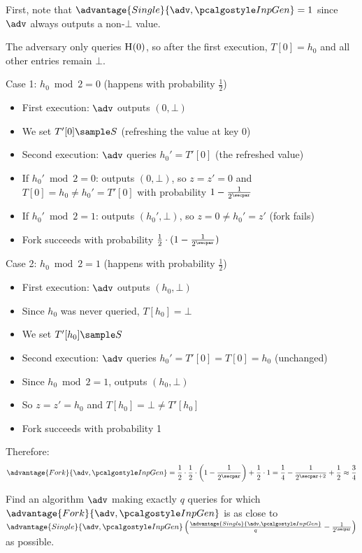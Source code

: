 \ifsolutions
\begin{mysolution}
  First, note that $\advantage{Single}{\adv, \algo{InpGen}} = 1$ since $\adv$ always outputs a non-$\bot$ value. 
  
  The adversary only queries ${\normalfont\textsc{H}}(0)$, so after the first execution, $T[0] = h_0$ and all other entries remain $\bot$.
  
  Case 1: $h_0 \bmod 2 = 0$ (happens with probability $\frac{1}{2}$)
  \begin{itemize}
    \item First execution: $\adv$ outputs $(0, \bot)$
    \item We set $T'[0] \sample S$ (refreshing the value at key 0)
    \item Second execution: $\adv$ queries $h_0' = T'[0]$ (the refreshed value)
    \item If $h_0' \bmod 2 = 0$: outputs $(0, \bot)$, so $z = z' = 0$ and $T[0] = h_0 \neq h_0' = T'[0]$ with probability $1 - \frac{1}{2^\secpar}$
    \item If $h_0' \bmod 2 = 1$: outputs $(h_0', \bot)$, so $z = 0 \neq h_0' = z'$ (fork fails)
    \item Fork succeeds with probability $\frac{1}{2} \cdot (1 - \frac{1}{2^\secpar})$
  \end{itemize}
  
  Case 2: $h_0 \bmod 2 = 1$ (happens with probability $\frac{1}{2}$)
  \begin{itemize}
    \item First execution: $\adv$ outputs $(h_0, \bot)$
    \item Since $h_0$ was never queried, $T[h_0] = \bot$
    \item We set $T'[h_0] \sample S$
    \item Second execution: $\adv$ queries $h_0' = T'[0] = T[0] = h_0$ (unchanged)
    \item Since $h_0 \bmod 2 = 1$, outputs $(h_0, \bot)$
    \item So $z = z' = h_0$ and $T[h_0] = \bot \neq T'[h_0]$
    \item Fork succeeds with probability 1
  \end{itemize}
  
  Therefore:
  \[
  \advantage{Fork}{\adv, \algo{InpGen}} = \frac{1}{2} \cdot \frac{1}{2} \cdot \left(1 - \frac{1}{2^\secpar}\right) + \frac{1}{2} \cdot 1 = \frac{1}{4} - \frac{1}{2^{\secpar+2}} + \frac{1}{2} \approx \frac{3}{4}
  \]
\end{mysolution}
\fi

\begin{exercise}[Optional]
  Find an algorithm $\adv$ making exactly $q$ queries for which $\advantage{Fork}{\adv, \algo{InpGen}}$ is as close to $\advantage{Single}{\adv, \algo{InpGen}} \left( \frac{\advantage{Single}{\adv, \algo{InpGen}}}{q} - \frac{1}{2^\secpar} \right)$ as possible.
\end{exercise}

